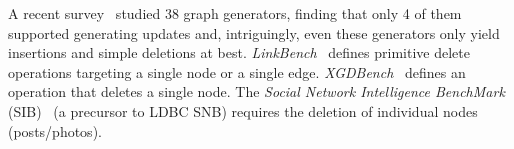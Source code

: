 
A recent survey~\cite{DBLP:journals/csur/BonifatiHPS20} studied 38 graph generators, finding that only 4 of them supported generating updates and, intriguingly, even these generators only yield insertions and simple deletions at best.
\emph{LinkBench}~\cite{DBLP:conf/sigmod/ArmstrongPBC13} defines primitive delete operations targeting a single node or a single edge.
\emph{XGDBench}~\cite{DBLP:journals/ase/DayarathnaS14} defines an operation that deletes a single node.
The \emph{Social Network Intelligence BenchMark} (SIB)~\cite{SIB} (a precursor to LDBC SNB) requires the deletion of individual nodes (posts/photos).

